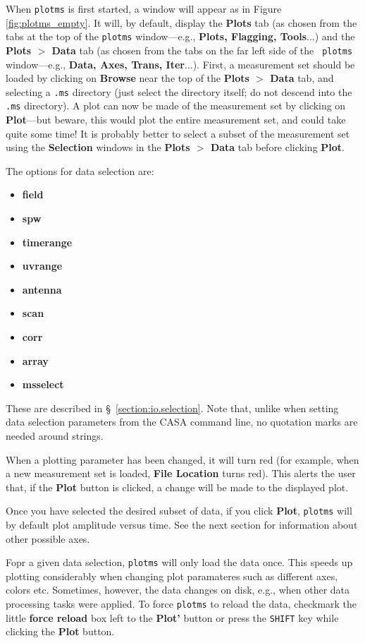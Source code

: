 When {\tt plotms} is first started, a window will appear as in Figure
\ref{fig:plotms_empty}. It will, by default, display the {\bf Plots}
tab (as chosen from the tabs at the top of the {\tt plotms}
window---e.g., {\bf Plots, Flagging, Tools}...) and the {\bf Plots $>$
  Data} tab (as chosen from the tabs on the far left side of the {\tt
  plotms} window---e.g., {\bf Data, Axes, Trans, Iter}...). First, a
measurement set should be loaded by clicking on {\bf Browse} near the
top of the {\bf Plots $>$ Data} tab, and selecting a {\tt .ms}
directory (just select the directory itself; do not descend into the
{\tt .ms} directory). A plot can now be made of the measurement set by
clicking on {\bf Plot}---but beware, this would plot the entire
measurement set, and could take quite some time! It is probably better
to select a subset of the measurement set using the {\bf Selection}
windows in the {\bf Plots $>$ Data} tab before clicking {\bf
  Plot}. 

The options for data selection are:
\begin{itemize}
   \item {\bf field}
   \item {\bf spw}
   \item {\bf timerange}
   \item {\bf uvrange}
   \item {\bf antenna}
   \item {\bf scan}
   \item {\bf corr}
   \item {\bf array}
   \item {\bf msselect}
\end{itemize}
These are described in \S~\ref{section:io.selection}. Note that,
unlike when setting data selection parameters from the CASA command
line, no quotation marks are needed around strings.

When a plotting parameter has been changed, it will turn red (for
example, when a new measurement set is loaded, {\bf File Location}
turns red). This alerts the user that, if the {\bf Plot} button is
clicked, a change will be made to the displayed plot.

Once you have selected the desired subset of data, if you click {\bf
  Plot}, {\tt plotms} will by default plot amplitude versus time. See
the next section for information about other possible axes.

Fopr a given data selection, {\tt plotms} will only load the data
once. This speeds up plotting considerably when changing plot
paramateres such as different axes, colors etc. Sometimes, however,
the data changes on disk, e.g., when other data processing tasks were
applied. To force {\tt plotms} to reload the data, checkmark the
little {\bf force reload} box left to the {\bf Plot'} button or press
the {\tt SHIFT} key while clicking the {\bf Plot} button.

